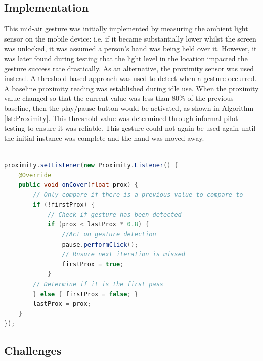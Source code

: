\documentclass{l4proj}
\begin{document}
\subsection{Implementation}
This mid-air gesture was initially implemented by measuring the ambient light sensor on the mobile device: i.e. if it became substantially lower whilst the screen was unlocked, it was assumed a person's hand was being held over it. However, it was later found during testing that the light level in the location impacted the gesture success rate drastically. As an alternative, the proximity sensor was used instead. A threshold-based approach was used to detect when a gesture occurred. A baseline proximity reading was established during idle use. When the proximity value changed so that the current value was less than 80\% of the previous baseline, then the play/pause button would be activated, as shown in Algorithm \ref{lst:Proximity}. This threshold value was determined through informal pilot testing to ensure it was reliable. This gesture could not again be used again until the initial instance was complete and the hand was moved away.

\begin{lstlisting}[language=java, float, caption={Java code detailing how the Pause/Play gesture is detected and how it is acted upon.}, label=lst:Proximity]

proximity.setListener(new Proximity.Listener() {
    @Override
    public void onCover(float prox) {
        // Only compare if there is a previous value to compare to
        if (!firstProx) {
            // Check if gesture has been detected
            if (prox < lastProx * 0.8) {
                //Act on gesture detection
                pause.performClick();
                // Rnsure next iteration is missed
                firstProx = true;
            }
        // Determine if it is the first pass
        } else { firstProx = false; }
        lastProx = prox;
    }
});
\end{lstlisting}

\subsection{Challenges}
\end{document}
